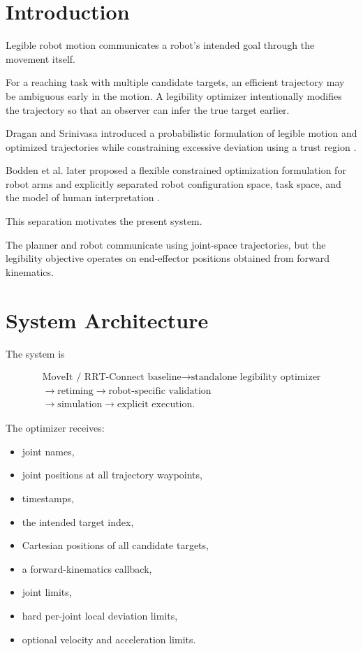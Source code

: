 \documentclass[11pt]{article}
\begin{document}
\section{Introduction}

Legible robot motion communicates a robot's intended goal
through the movement itself.

For a reaching task with multiple candidate targets, an
efficient trajectory may be ambiguous early in the motion.
A legibility optimizer intentionally modifies the trajectory so
that an observer can infer the true target earlier.

Dragan and Srinivasa introduced a probabilistic formulation of
legible motion and optimized trajectories while constraining
excessive deviation using a trust region
\cite{dragan2013}.

Bodden et al. later proposed a flexible constrained
optimization formulation for robot arms and explicitly
separated robot configuration space, task space, and the model
of human interpretation \cite{bodden2018}.

This separation motivates the present system.

The planner and robot communicate using joint-space
trajectories, but the legibility objective operates on
end-effector positions obtained from forward kinematics.

\section{System Architecture}

The system is

\[
\begin{gathered}
\text{MoveIt / RRT-Connect baseline}
\longrightarrow \text{standalone legibility optimizer} \\
\longrightarrow \text{retiming}
\longrightarrow \text{robot-specific validation} \\
\longrightarrow \text{simulation}
\longrightarrow \text{explicit execution}.
\end{gathered}
\]

The optimizer receives:

\begin{itemize}
    \item joint names,
    \item joint positions at all trajectory waypoints,
    \item timestamps,
    \item the intended target index,
    \item Cartesian positions of all candidate targets,
    \item a forward-kinematics callback,
    \item joint limits,
    \item hard per-joint local deviation limits,
    \item optional velocity and acceleration limits.
\end{itemize}
\end{document}
